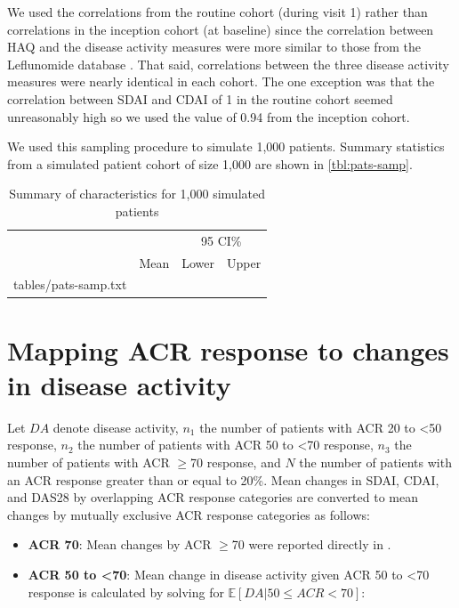 \documentclass[11pt,final,fleqn]{article}\usepackage[]{graphicx}\usepackage[]{color}
\makeatletter
\theoremstyle{plain}
\newcommand\E{\mathbb{E}}
\newcommand*\ExpandableInput[1]{\@@input#1 }
\makeatother
\begin{document}
\begin{appendices}
We used the correlations from the routine cohort (during visit 1) rather than correlations in the inception cohort (at baseline) since the correlation between HAQ and the disease activity measures were more similar to those from the Leflunomide database \citep{smolen2003simplified}. That said, correlations between the three disease activity measures were nearly identical in each cohort. The one exception was that the correlation between SDAI and CDAI of 1 in the routine cohort seemed unreasonably high so we used the value of 0.94 from the inception cohort. 




We used this sampling procedure to simulate 1,000 patients. Summary statistics from a simulated patient cohort of size 1,000 are shown in \autoref{tbl:pats-samp}.

\begin{table}[!ht]
\begin{center}
\begin{threeparttable}
\caption{Summary of characteristics for 1,000 simulated patients} \label{tbl:pats-samp}
\begin{tabularx}{\textwidth}{@{\extracolsep{\fill}}lccc}
\hline
\multicolumn{2}{c}{} & \multicolumn{2}{c}{95 CI\%} \\
\cmidrule{3-4}
\multicolumn{1}{l}{} & \multicolumn{1}{c}{Mean} & \multicolumn{1}{c}{Lower} & \multicolumn{1}{c}{Upper}\\
\hline
\ExpandableInput{tables/pats-samp.txt}
\hline
\end{tabularx}
\scriptsize
\end{threeparttable}
\end{center}
\end{table}

\section{Mapping ACR response to changes in disease activity}\label{app-acr-da}
Let $DA$ denote disease activity, $n_1$ the number of patients with ACR 20 to <50 response, $n_2$ the number of patients with ACR 50 to <70 response, $n_3$ the number of patients with ACR $\geq$70 response, and $N$ the number of patients with an ACR response greater than or equal to 20\%. Mean changes in SDAI, CDAI, and DAS28 by overlapping ACR response categories are converted to mean changes by mutually exclusive ACR response categories as follows:

\begin{itemize}
\item \textbf{ACR 70}: Mean changes by ACR $\geq$70 were reported directly in \citet{aletaha2005simplified}.
\item \textbf{ACR 50 to <70}: Mean change in disease activity given ACR 50 to <70 response is calculated by solving for $\E[DA|50 \leq ACR < 70]$:


\end{itemize}
\end{appendices}
\end{document}
